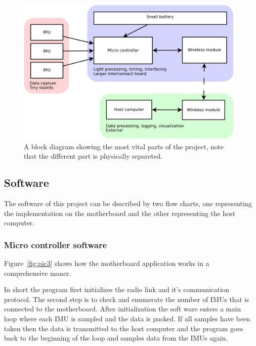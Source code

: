 \documentclass[a4paper, 12pt]{article}
\begin{document}
\begin{figure}[h!]
    \centering
    \includegraphics[scale=0.38]{block.pdf}
    \caption{A block diagram showing the most vital parts of the project, note that the different part is physically separeted.}
    \label{fig:pic2}
\end{figure}

\newpage
\subsection*{Software}
The software of this project can be described by two flow charts, one representing the implementation on the motherboard and the other representing the host computer.

\subsubsection{Micro controller software}
Figure~\ref{fig:pic3} shows how the motherboard application works in a comprehensive maner. 

In short the program first initializes the radio link and it's communication protocol. The second step is to check and enumerate the number of IMUs that is connected to the motherboard. After initialization the soft ware enters a main loop where each IMU is sampled and the data is packed. If all samples have been taken then the data is transmitted to the host computer and the program goes back to the beginning of the loop and samples data from the IMUs again.    
\end{document}
